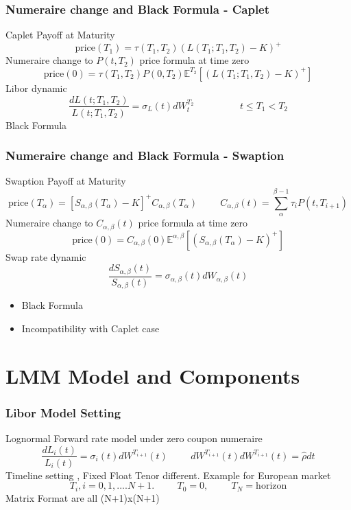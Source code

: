 \documentclass[8pt]{beamer}
\newcommand{\Ta}{T_{\alpha}}
\newcommand{\Tii}{T_{i+1}}
\newcommand{\Ptii}{P(t,T_{i+1})}
\newcommand{\Lit}{L_{i}(t)}
\newcommand{\sigmait}{\sigma_i(t)}
\newcommand{\Wit}{W^{\Tii}(t)}
\newcommand{\Sab}{S_{\alpha,\beta}}
\newcommand{\Cab}{C_{\alpha,\beta}}
\newcommand{\Wab}{W_{\alpha,\beta}}
\newcommand{\sigmaab}{\sigma_{\alpha,\beta}}
\newcommand{\Eab}{\mathbb{E}^{\alpha,\beta}}
\begin{document}
\begin{frame}
\frametitle{Numeraire change and Black Formula - Caplet}
Caplet Payoff at Maturity
\[
\text{price}(T_1) = \tau(T_1,T_2)( L(T_1;T_1,T_2) - K )^+ 
\]
Numeraire change to $P(t,T_2)$ price formula at time zero
\[
\text{price}(0) = \tau(T_1,T_2)P(0,T_2) \mathbb{E}^{T_2}\left[ ( L(T_1;T_1,T_2) - K )^+  \right]
\]
Libor dynamic
\[
\frac{dL(t;T_1,T_2)}{L(t;T_1,T_2)} = \sigma_{L}(t)dW^{T_2}_t
\hspace{2cm}
t\leq T_1 < T_2
\]
Black Formula
\end{frame}

\begin{frame}
\frametitle{Numeraire change and Black Formula - Swaption}
Swaption Payoff at Maturity
\[
\text{price}(\Ta) = \left[ \Sab(\Ta) - K \right]^+ \Cab(\Ta)
\hspace{1cm}
\Cab(t) = \sum^{\beta-1}_{\alpha} \tau_i \Ptii 
\] 
Numeraire change to $\Cab(t)$ price formula at time zero
\[
\text{price}(0) = \Cab(0) \Eab \left[ (\Sab(\Ta) - K )^+  \right]
\]
Swap rate dynamic
\[
\frac{d\Sab(t)}{\Sab(t)} = \sigmaab(t) d\Wab(t)
\]
\begin{itemize}
\item Black Formula
\item Incompatibility with Caplet case
\end{itemize}
\end{frame}

\section{LMM Model and Components}
\begin{frame}
\frametitle{Libor Model Setting}
Lognormal Forward rate model under zero coupon numeraire
\[
\frac{d\Lit}{\Lit} = \sigmait d\Wit 
\hspace{1cm}
d\Wit d\Wit = \hat{\rho} dt
\]
Timeline setting , Fixed Float Tenor different. Example for European market 
\[
T_i , i = 0,1, .... N+1. 
\hspace{1cm}
T_0=0,
\hspace{1cm}
T_N=\text{horizon}
\]
Matrix Format are all (N+1)x(N+1)
\end{frame}
\end{document}

